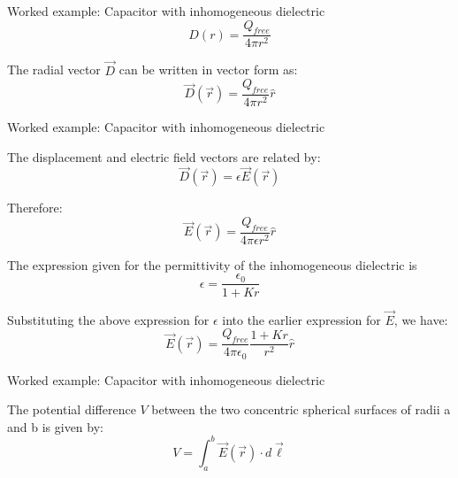 {\begin{frame}{Worked example: Capacitor with inhomogeneous dielectric}
  \begin{equation*}
     D(r) = \frac{Q_{free}}{4\pi r^2}
  \end{equation*}

  The radial vector $\vec{D}$ can be written in vector form as:
  \begin{equation*}
     \vec{D}(\vec{r}) = \frac{Q_{free}}{4\pi r^2} \hat{r}
  \end{equation*}

\end{frame}

%
%
%

\begin{frame}{Worked example: Capacitor with inhomogeneous dielectric}

  The displacement and electric field vectors are related by:
  \begin{equation*}
     \vec{D}(\vec{r}) = \epsilon \vec{E}(\vec{r})
  \end{equation*}

  Therefore:
  \begin{equation*}
     \vec{E}(\vec{r}) = \frac{Q_{free}}{4\pi \epsilon r^2} \hat{r}
  \end{equation*}

  The expression given for the permittivity of the inhomogeneous
  dielectric is
  \begin{equation*}
     \epsilon = \frac{\epsilon_0}{1+Kr}
  \end{equation*}

  Substituting the above expression for $\epsilon$
  into the earlier expression for $\vec{E}$, we have:
  \begin{equation*}
     \vec{E}(\vec{r}) = \frac{Q_{free}}{4\pi \epsilon_0} \frac{1+Kr}{r^2} \hat{r}
  \end{equation*}

\end{frame}

%
%
%

\begin{frame}{Worked example: Capacitor with inhomogeneous dielectric}

  The potential difference $V$ between the two concentric spherical
  surfaces of radii a and b is given by:
  \begin{equation*}
     V = \int_{a}^{b} \vec{E}(\vec{r}) \cdot d\vec{\ell}
  \end{equation*}


\end{frame}}
